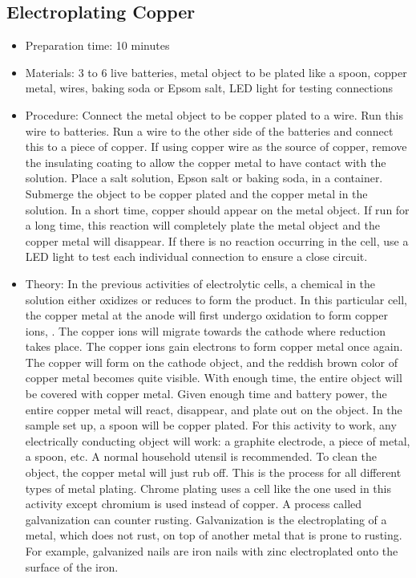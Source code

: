 \subsection{Electroplating Copper}
\begin{itemize}
\item{Preparation time: 10 minutes}
\item{Materials: 3 to 6 live batteries, metal object to be plated like a spoon, copper metal, wires, baking soda or Epsom salt, LED light for testing connections}
\item{Procedure: Connect the metal object to be copper plated to a wire. Run this wire to batteries. Run a wire to the other side of the batteries and connect this to a piece of copper. If using copper wire as the source of copper, remove the insulating coating to allow the copper metal to have contact with the solution. Place a salt solution, Epson salt or baking soda, in a container. Submerge the object to be copper plated and the copper metal in the solution. In a short time, copper should appear on the metal object. If run for a long time, this reaction will completely plate the metal object and the copper metal will disappear. If there is no reaction occurring in the cell, use a LED light to test each individual connection to ensure a close circuit.}
\item{Theory: In the previous activities of electrolytic cells, a chemical in the solution either oxidizes or reduces to form the product. In this particular cell, the copper metal at the anode will first undergo oxidation to form copper ions, . The copper ions will migrate towards the cathode where reduction takes place. The copper ions gain electrons to form copper metal once again. The copper will form on the cathode object, and the reddish brown color of copper metal becomes quite visible. With enough time, the entire object will be covered with copper metal. Given enough time and battery power, the entire copper metal will react, disappear, and plate out on the object. In the sample set up, a spoon will be copper plated. For this activity to work, any electrically conducting object will work: a graphite electrode, a piece of metal, a spoon, etc. A normal household utensil is recommended. To clean the object, the copper metal will just rub off. This is the process for all different types of metal plating. Chrome plating uses a cell like the one used in this activity except chromium is used instead of copper. A process called galvanization can counter rusting. Galvanization is the electroplating of a metal, which does not rust, on top of another metal that is prone to rusting. For example, galvanized nails are iron nails with zinc electroplated onto the surface of the iron.}
\end{itemize}

